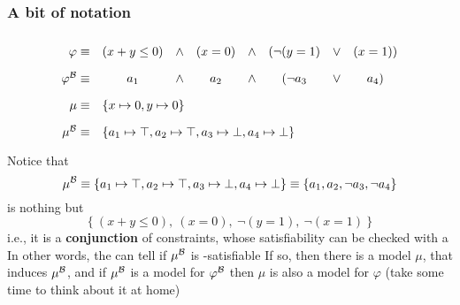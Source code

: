 \begin{frame}
  \frametitle{A bit of notation}

  \scriptsize
  $$
  \ra{1.8} 
  \begin{array}{rccccccc}
    \varphi \equiv         & (x + y \leq 0) & \wedge & (x = 0) & \wedge & (\neg (y=1) & \vee & (x = 1) ) \\
    \babst{\varphi} \equiv & a_1            & \wedge & a_2     & \wedge & (\neg a_3 & \vee & a_4     ) \\ 
    \mu     \equiv         & \multicolumn{7}{l}{\{ x \mapsto 0, y \mapsto 0 \}}       \\
    \babst{\mu} \equiv     & \multicolumn{7}{l}{\{ a_1 \mapsto \top, a_2 \mapsto \top, a_3 \mapsto \bot, a_4 \mapsto \bot \}}
  \end{array}
  $$
  \vfill
  Notice that
  $$\mu^{\mathcal{B}} \equiv \{ a_1 \mapsto \top, a_2 \mapsto \top, a_3 \mapsto \bot, a_4 \mapsto \bot \} \equiv \{ a_1, a_2, \neg a_3, \neg a_4 \}$$
  is nothing but
  $$\{\ (x+y \leq 0),\ (x=0),\ \neg (y=1),\ \neg (x=1)\ \}$$
  i.e., it is a {\bf conjunction} of constraints, whose satisfiability can be checked with a \tsolver
  \vfill\pause
  In other words, the \tsolver can tell if $\mu^{\mathcal{B}}$ is \T-satisfiable
  \vfill
  If so, then there is a model $\mu$, that induces $\mu^{\mathcal{B}}$, and if
  $\mu^{\mathcal{B}}$ is a model for $\varphi^{\mathcal{B}}$ then $\mu$ is also a
  model for $\varphi$ (take some time to think about it at home)

\end{frame}
